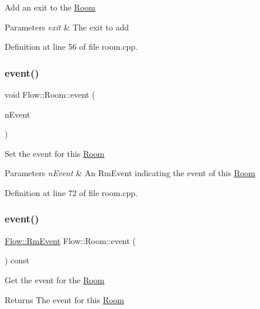 Add an exit to the \hyperlink{class_flow_1_1_room}{Room} 
\begin{DoxyParams}{Parameters}
{\em exit} & The exit to add \\
\hline
\end{DoxyParams}


Definition at line 56 of file room.\+cpp.

\hypertarget{class_flow_1_1_room_abf44d5659e88ff6cef74e5a95350d09d}{}\label{class_flow_1_1_room_abf44d5659e88ff6cef74e5a95350d09d} 
\subsubsection{\texorpdfstring{event()}{event()}\hspace{0.1cm}{\footnotesize\ttfamily [1/2]}}
{\footnotesize\ttfamily void Flow\+::\+Room\+::event (\begin{DoxyParamCaption}\item[{\hyperlink{namespace_flow_a01e62c2d0a9c24924a2fce4b667dd9d8}{Rm\+Event}}]{n\+Event }\end{DoxyParamCaption})}

Set the event for this \hyperlink{class_flow_1_1_room}{Room} 
\begin{DoxyParams}{Parameters}
{\em n\+Event} & An Rm\+Event indicating the event of this \hyperlink{class_flow_1_1_room}{Room} \\
\hline
\end{DoxyParams}


Definition at line 72 of file room.\+cpp.

\hypertarget{class_flow_1_1_room_a5f32585a64d31afb8add2d20eb884a85}{}\label{class_flow_1_1_room_a5f32585a64d31afb8add2d20eb884a85} 
\subsubsection{\texorpdfstring{event()}{event()}\hspace{0.1cm}{\footnotesize\ttfamily [2/2]}}
{\footnotesize\ttfamily \hyperlink{namespace_flow_a01e62c2d0a9c24924a2fce4b667dd9d8}{Flow\+::\+Rm\+Event} Flow\+::\+Room\+::event (\begin{DoxyParamCaption}{ }\end{DoxyParamCaption}) const}

Get the event for the \hyperlink{class_flow_1_1_room}{Room} \begin{DoxyReturn}{Returns}
The event for this \hyperlink{class_flow_1_1_room}{Room} 
\end{DoxyReturn}


